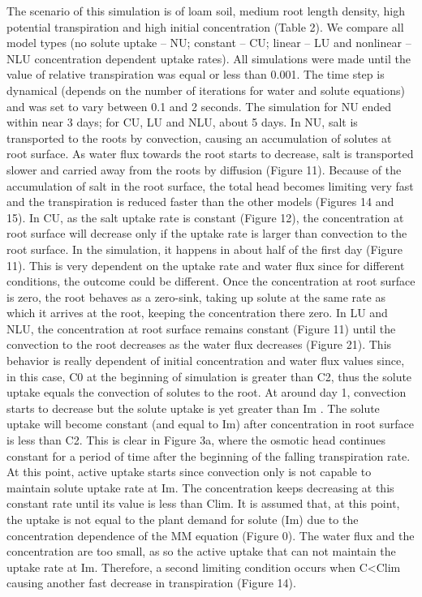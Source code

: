 The scenario of this simulation is of loam soil, medium root length density, high potential transpiration and high initial concentration (Table 2). We compare all model types (no solute uptake – NU; constant – CU; linear – LU and nonlinear – NLU concentration dependent uptake rates). All simulations were made until the value of relative transpiration was equal or less than 0.001. The time step is dynamical (depends on the number of iterations for water and solute equations) and was set to vary between 0.1 and 2 seconds. The simulation for NU ended within near 3 days; for CU, LU and NLU, about 5 days.
In NU, salt is transported to the roots by convection, causing an accumulation of solutes at root surface. As water flux towards the root starts to decrease, salt is transported slower and carried away from the roots by diffusion (Figure 11). Because of the accumulation of salt in the root surface, the total head becomes limiting very fast and the transpiration is reduced faster than the other models (Figures 14 and 15).
In CU, as the salt uptake rate is constant (Figure 12), the concentration at root surface will decrease only if the uptake rate is larger than convection to the root surface. In the simulation, it happens in about half of the first day (Figure 11). This is very dependent on the uptake rate and water flux since for different conditions, the outcome could be different. Once the concentration at root surface is zero, the root behaves as a zero-sink, taking up solute at the same rate as which it arrives at the root, keeping the concentration there zero.
In LU and NLU, the concentration at root surface remains constant (Figure 11) until the convection to the root decreases as the water flux decreases (Figure 21). This behavior is really dependent of initial concentration and water flux values since, in this case, C0 at the beginning of simulation is greater than C2, thus the solute uptake equals the convection of solutes to the root. At around day 1, convection starts to decrease but the solute uptake is yet greater than Im . The solute uptake will become constant (and equal to Im) after concentration in root surface is less than C2. This is clear in Figure 3a, where the osmotic head continues constant for a period of time after the beginning of the falling transpiration rate. At this point, active uptake starts since convection only is not capable to maintain solute uptake rate at Im. The concentration keeps decreasing at this constant rate until its value is less than Clim. It is assumed that, at this point, the uptake is not equal to the plant demand for solute (Im) due to the concentration dependence of the MM equation (Figure 0). The water flux and the concentration are too small, as so the active uptake that can not maintain the uptake rate at Im. Therefore, a second limiting condition occurs when C<Clim causing another fast decrease in transpiration (Figure 14).
